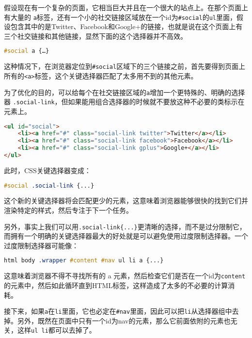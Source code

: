 假设现在有一个复杂的页面，它相当巨大并且在一个很大的站点上。在那个页面上有大量的 \texttt{a}标签，还有一个小的社交链接区域放在一个id为\texttt{\#social}的\texttt{ul}里面，假设包含其中的是Twitter、Facebook和Google+的链接，也就是说在这个页面上有三个社交链接和其他链接，显然下面的这个选择器并不高效。

\begin{lstlisting}[language=CSS]
#social a {…}
\end{lstlisting}

这种情况下，在浏览器定位到\texttt{\#social}区域下的三个链接之前，首先要得到页面上所有的\texttt{<a>}标签，这个关键选择器匹配了太多用不到的其他元素。

为了优化的目的，可以给每个在社交链接区域的\texttt{a}增加一个更特殊的、明确的选择器 \texttt{.social-link}，但如果能用组合选择器的时候就不要放这种不必要的类标示在元素上。

\begin{lstlisting}[language=HTML]
<ul id="social">
    <li><a href="#" class="social-link twitter">Twitter</a></li>
    <li><a href="#" class="social-link facebook">Facebook</a></li>
    <li><a href="#" class="social-link gplus">Google+</a></li>
</ul>
\end{lstlisting}

此时，CSS关键选择器变成：


\begin{lstlisting}[language=CSS]
#social .social-link {...}
\end{lstlisting}

这个新的关键选择器将会匹配更少的元素，这意味着浏览器能够很快的找到它们并渲染特定的样式，然后专注于下一个任务。

另外，事实上我们可以用\texttt{.social-link\{...\}}更清晰的选择，而不是过分限制它，而拥有一个明确的关键选择器最大的好处就是可以避免使用过度限制选择器。一个过度限制选择器可能像：

\begin{lstlisting}[language=CSS]
html body .wrapper #content #nav ul li a {...}
\end{lstlisting}

这意味着浏览器不得不寻找所有的 a 元素，然后检查它们是否在一个id为\texttt{content}的元素中，然后如此循环直到HTML标签，这样造成了太多的不必要的计算消耗。

接下来，如果\texttt{a}在\texttt{li}里面，它也必定在\texttt{\#nav}里面，因此可以把\texttt{li}从选择器组中去掉。另外，既然在页面中只有一个id为nav的元素，那么它前面依附的元素也无关，这样\texttt{ul li}都可以去掉了。

